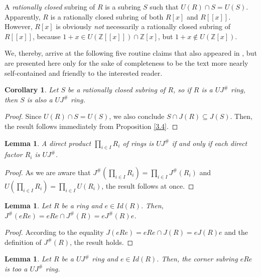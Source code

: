 \documentclass[12pt]{amsart}
\newtheorem{lemma}[theorem]{Lemma}
\newtheorem{corollary}[theorem]{Corollary}
\theoremstyle{definition}
\begin{document}
A {\it rationally closed} subring of $R$ is a subring $S$ such that $U(R) \cap S = U(S)$. Apparently, $R$ is a rationally closed subring of both $R[x]$ and $R[[x]]$. However, $R[x]$ is obviously {\it not} necessarily a rationally closed subring of $R[[x]]$, because $1+x \in U(\mathbb{Z}[[x]]) \cap \mathbb{Z}[x]$, but $1+x \not\in U(\mathbb{Z}[x])$.

\medskip

We, thereby, arrive at the following five routine claims that also appeared in \cite{SU}, but are presented here only for the sake of completeness to be the text more nearly self-contained and friendly to the interested reader.

\begin{corollary}\label{subring}
Let $S$ be a rationally closed subring of $R$, so if $R$ is a $UJ^{\#}$ ring, then $S$ is also a $UJ^{\#}$ ring.
\end{corollary}

\begin{proof}
Since $U(R) \cap S = U(S)$, we also conclude \(S \cap J(R) \subseteq J(S)\). Then, the result follows immediately from Proposition \ref{3.4}.
\end{proof}

\begin{lemma}\label{product}
A direct product $\prod_{i\in I} R_i$ of rings is $UJ^{\#}$ if and only if each direct factor $R_i$ is $UJ^{\#}$.
\end{lemma}

\begin{proof}
As we are aware that \(J^{\#}(\prod_{i \in I} R_i) = \prod_{i \in I} J^{\#}(R_i)\) and \(U(\prod_{i \in I} R_i) = \prod_{i \in I} U(R_i)\), the result follows at once.	
\end{proof}

\begin{lemma}\label{1.5}
Let $R$ be a ring and $e \in Id(R)$. Then, $J^{\#}(eRe)=eRe\cap J^{\#}(R)=eJ^{\#}(R)e$.
\end{lemma}

\begin{proof}
According to the equality $J(eRe)=eRe\cap J(R)=eJ(R)e$ and the definition of $J^{\#}(R)$, the result holds.
\end{proof}

\begin{lemma}\label{corner}
Let $R$ be a $UJ^{\#}$ ring and $e \in Id(R)$. Then, the corner subring $eRe$ is too a $UJ^{\#}$ ring.
\end{lemma}
\end{document}
